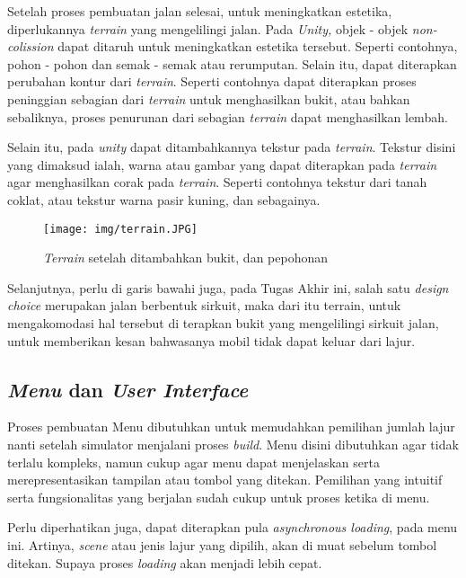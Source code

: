 	\par Setelah proses pembuatan jalan selesai, untuk meningkatkan estetika, diperlukannya \textit{terrain} yang mengelilingi jalan. Pada \textit{Unity,} objek - objek \textit{non-colission} dapat ditaruh untuk meningkatkan estetika tersebut. Seperti contohnya, pohon - pohon dan semak - semak atau rerumputan. Selain itu, dapat diterapkan perubahan kontur dari \textit{terrain}. Seperti contohnya dapat diterapkan proses peninggian sebagian dari \textit{terrain} untuk menghasilkan bukit, atau bahkan sebaliknya, proses penurunan dari sebagian \textit{terrain} dapat menghasilkan lembah.
	
    Selain itu, pada \textit{unity} dapat ditambahkannya tekstur pada \textit{terrain}. Tekstur disini yang dimaksud ialah, warna atau gambar yang dapat diterapkan pada \textit{terrain} agar menghasilkan corak pada \textit{terrain}. Seperti contohnya tekstur dari tanah coklat, atau tekstur warna pasir kuning, dan sebagainya.
    
    \begin{figure} [!htb]
	    \captionsetup{justification=centering}
	    \texttt{[image: img/terrain.JPG]}
	    \caption{\textit{Terrain} setelah ditambahkan bukit, dan pepohonan}
	    \label{fig: 3_17}
    \end{figure}
    
    Selanjutnya, perlu di garis bawahi juga, pada Tugas Akhir ini, salah satu \textit{design choice} merupakan jalan berbentuk sirkuit, maka dari itu terrain, untuk mengakomodasi hal tersebut di terapkan bukit yang mengelilingi sirkuit jalan, untuk memberikan kesan bahwasanya mobil tidak dapat keluar dari lajur.
    
    \subsection{\textit{Menu} dan \textit{User Interface}}
    
    Proses pembuatan Menu dibutuhkan untuk memudahkan pemilihan jumlah lajur nanti setelah simulator menjalani proses \textit{build}. Menu disini dibutuhkan agar tidak terlalu kompleks, namun cukup agar menu dapat menjelaskan serta merepresentasikan tampilan atau tombol yang ditekan. Pemilihan yang intuitif serta fungsionalitas yang berjalan sudah cukup untuk proses ketika di menu.
    \par Perlu diperhatikan juga, dapat diterapkan pula \textit{asynchronous loading}, pada menu ini. Artinya, \textit{scene} atau jenis lajur yang dipilih, akan di muat sebelum tombol ditekan. Supaya proses \textit{loading} akan menjadi lebih cepat.
    
